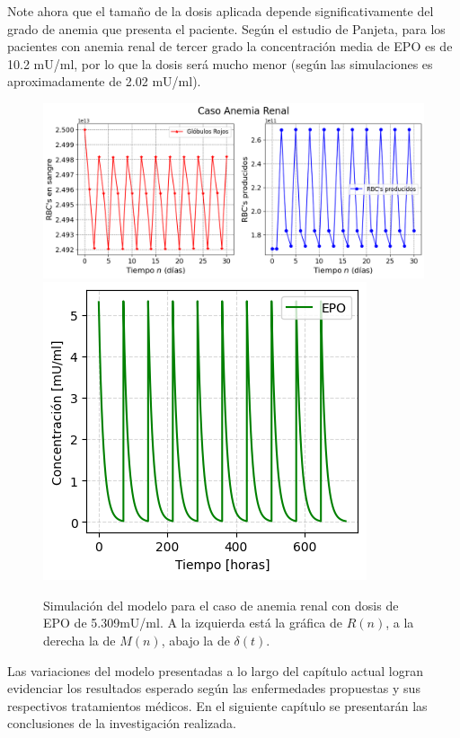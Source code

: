 Note ahora que el tamaño de la dosis aplicada depende significativamente del grado de anemia que presenta el paciente. Según el estudio de Panjeta, para los pacientes con anemia renal de tercer grado la concentración media de EPO es de 10.2 mU/ml, por lo que la dosis será mucho menor (según las simulaciones es aproximadamente de 2.02 mU/ml).
\begin{figure}[H]
    \centering
    \captionsetup{justification=centering}
    \includegraphics[scale=0.526]{figures/AR21.png}
    \includegraphics[scale=0.8]{figures/AR22.png}
    \caption{Simulación del modelo para el caso de anemia renal con dosis de EPO de 5.309mU/ml. A la izquierda está la gráfica de $R(n)$, a la derecha la de $M(n)$, abajo la de $\delta(t)$.}
    \label{sec:variaciones:fig:Anemia2}
\end{figure}

Las variaciones del modelo presentadas a lo largo del capítulo actual logran evidenciar los resultados esperado según las enfermedades propuestas y sus respectivos tratamientos médicos. En el siguiente capítulo se presentarán las conclusiones de la investigación realizada.